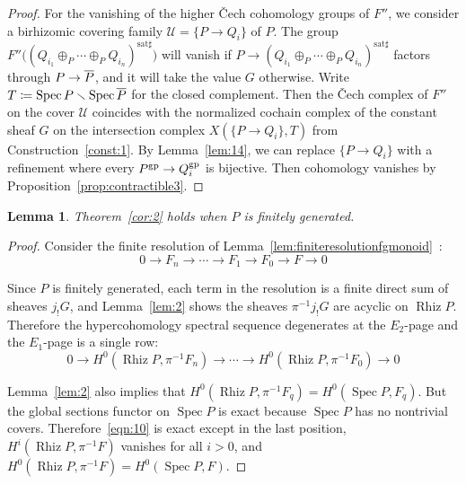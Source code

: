 \documentclass[10pt]{article}
\numberwithin{equation}{section}
\newtheorem{lemma}[paragraph]{Lemma}
\theoremstyle{definition}
\theoremstyle{remark}
\def\Spec{\operatorname{Spec}}
\def\spec{\Spec}
\def\Rh{\operatorname{Rhiz}}
\newcommand{\gp}[1]{#1^{\rm gp}}
\renewcommand{\bar}[1]{\overnorm{#1}\vphantom{#1}}
\def\overnorm#1{\overline{#1}\vphantom{#1}}
\begin{document}
\begin{proof}
	For the vanishing of the higher \v Cech cohomology groups of $F''$, we consider a birhizomic covering family $\mathcal U = \{ P \to Q_i \}$ of $P$. The group $F''\bigl( ( Q_{i_1} \mathop\oplus_P \cdots \mathop\oplus_P Q_{i_n} )^{\mathrm{sat}\sharp} \bigr)$ will vanish if  $P \to (Q_{i_1} \mathop\oplus_P \cdots \mathop\oplus_P Q_{i_n})^{\mathrm{sat}\sharp}$ factors through $P \to \bar P$, and it will take the value $G$ otherwise.  Write $T \coloneqq \spec P \smallsetminus \spec \bar P$ for the closed complement. Then the \v Cech complex of $F''$ on the cover $\mathcal U$ coincides with the normalized cochain complex of the constant sheaf $G$ on the intersection complex $X( \{ P \to Q_i \}, T )$ from Construction~\ref{const:1}.  By Lemma~\ref{lem:14}, we can replace $\{ P \to Q_i \}$ with a refinement where every $\gp P \to \gp Q_i$ is bijective.  Then cohomology vanishes by Proposition~\ref{prop:contractible3}.
\end{proof}





\begin{lemma} \label{lem:4}
	Theorem~\ref{cor:2} holds when $P$ is finitely generated.
\end{lemma}
\begin{proof}
	Consider the finite resolution of Lemma~\ref{lem:finiteresolutionfgmonoid}~:
	\begin{equation*}
		0 \to F_n \to \cdots  \to F_1 \to F_0 \to F \to 0
	\end{equation*}

	Since $P$ is finitely generated, each term in the resolution is a finite direct sum of sheaves $j_! G$, and Lemma~\ref{lem:2} shows the sheaves $\pi^{-1} j_! G$ are acyclic on $\Rh P$.  Therefore the hypercohomology spectral sequence degenerates at the $E_2$-page and the $E_1$-page is a single row:
	\begin{equation} \label{eqn:10}
		0 \to H^0(\Rh P, \pi^{-1} F_n) \to \cdots \to H^0(\Rh P, \pi^{-1} F_0) \to 0
	\end{equation}





	Lemma~\ref{lem:2} also implies that $H^0(\Rh P, \pi^{-1} F_q) = H^0(\spec P, F_q)$.  But the global sections functor on $\spec P$ is exact because $\spec P$ has no nontrivial covers.  Therefore~\eqref{eqn:10} is exact except in the last position, $H^i(\Rh P, \pi^{-1} F)$ vanishes for all $i > 0$, and $H^0(\Rh P, \pi^{-1} F) = H^0(\spec P, F)$.
\end{proof}
\end{document}

